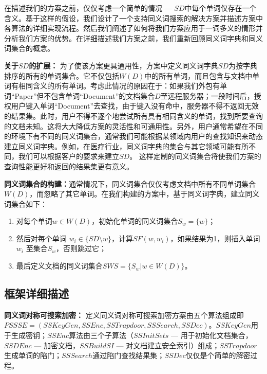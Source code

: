 在描述我们的方案之前，仅仅考虑一个简单的情况 --- $SD$中每个单词仅存在一个含义。基于这样的假设，我们设计了一个支持同义词搜索的解决方案并描述方案中各算法的详细实现流程。然后我们阐述了如何将我们方案应用于一词多义的情形并分析我们方案的优势。在详细描述我们方案之前，我们重新回顾同义词字典和同义词集合的概念。

\textbf{关于$SD$的扩展：} 为了使该方案更具通用性，方案中定义同义词字典$SD$为按字典排序的所有的单词集合。它不仅包括$W(D)$中的所有单词，而且包含与文档中单词有相同含义的所有单词。考虑此情况的原因在于：如果我们外包有单词“Paper”但不包含单词“Document”的文档集合$D$至远程服务器；一段时间后，授权用户键入单词“Document”去查找，由于键入没有命中，服务器不得不返回无效的结果集。此时，用户不得不逐个地尝试所有具有相同含义的单词，找到所要查询的文档未知。这将大大降低方案的灵活性和可通用性。另外，用户通常希望在不同的环境下有不同的同义词集合，通常我们可能根据某领域内用户的查找知识来动态建立同义词字典。例如，在医疗行业，同义词字典的集合与其它领域可能有所不同，我们可以根据客户的要求来建立$SD$。 这样定制的同义词集合将使我们方案的查询性能更好和返回的结果集更有意义。

\textbf{同义词集合的构建：}通常情况下，同义词集合仅仅考虑文档中所有不同单词集合$W(D)$，而忽略了其它单词。在我们构建的方案中，基于同义词字典，建立同义词集合如下：
\begin{enumerate}
  \item
  对每个单词$w \in W(D)$，初始化单词的同义词集合$S_w = \{w\}$；
  \item
  然后对每个单词 $w_i \in \{SD \setminus w\}$，计算$SF(w, w_i)$，如果结果为1，则插入单词$w_i$ 至集合$S_w$，否则跳过它；
  \item
  最后定义文档的同义词集合$SWS = \{S_w | w \in W(D) \}$。
\end{enumerate}



\subsection{\textbf{框架详细描述}}
\label{sec:synonym_scheme_description}

\textbf{同义词对称可搜索加密：} 定义同义词对称可搜索加密方案由五个算法组成即 $PSSSE = (SSKeyGen, SSEnc, SSTrapdoor, SSSearch, SSDec)$。$SSKeyGen$用于生成密钥；$SSEnc$算法由三个子算法（$SSInitSets$ --- 用于初始化文档集合，$SSDEnc$ --- 加密文档，$SSBuildSI$ --- 对文档建立安全索引）组成；$SSTrapdoor$ 生成单词的陷门；$SSSearch$通过陷门查找结果集；$SSDec$仅仅是个简单的解密过程。


